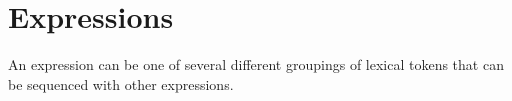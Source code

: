 \chapter{Expressions}

An expression can be one of several different groupings of lexical tokens that can be sequenced with other expressions.





